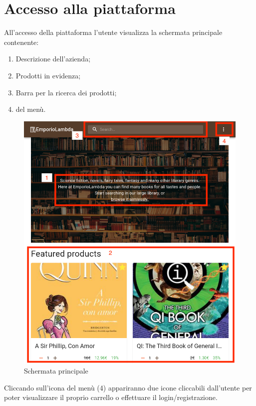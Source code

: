 \section{Accesso alla piattaforma}\label{Accesso}
All'accesso della piattaforma l'utente visualizza la schermata principale contenente:
\begin{enumerate}
	\item Descrizione dell'azienda;
	\item Prodotti in evidenza;
	\item Barra per la ricerca dei prodotti;
	\item {} del menù.
\end{enumerate} 
\begin{figure}[H]
	\centering
	\includegraphics[scale=0.4]{Immagini/Acquirente/home_primo_accesso.png}
	\caption{Schermata principale}
	\label{fig:Home}
\end{figure}
Cliccando sull'icona del menù (4) appariranno due icone cliccabili dall'utente per poter visualizzare il proprio carrello o effettuare il login/registrazione.
